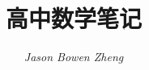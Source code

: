 \documentclass[a4paper, UTF8]{ctexbook}
\title{{\Huge 高中数学笔记}}
\author{\textit{Jason Bowen Zheng}}
\begin{document}
\frontmatter
\maketitle

\tableofcontents
\clearpage
\mainmatter
\raggedbottom


\end{document}
